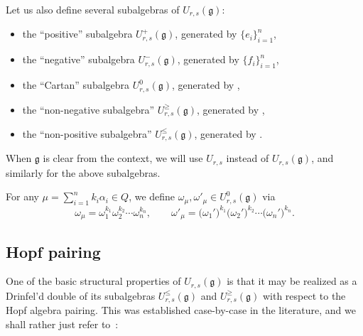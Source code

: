 \documentclass[pdftex]{sigma}
\numberwithin{equation}{section}
\newcommand{\fg}{\mathfrak{g}}
\begin{document}
Let us also define several subalgebras of $U_{r,s}(\fg)$:
\begin{itemize}\itemsep=0pt
\item the ``positive'' subalgebra $U_{r,s}^{+}(\fg)$, generated by $\{e_{i}\}_{i=1}^{n}$,

\item the ``negative'' subalgebra $U_{r,s}^{-}(\fg)$, generated by $\{f_{i}\}_{i=1}^{n}$,

\item the ``Cartan'' subalgebra $U_{r,s}^{0}(\fg)$, generated by
,

\item the ``non-negative subalgebra'' $U_{r,s}^{\ge}(\fg)$, generated by
,

\item the ``non-positive subalgebra'' $U_{r,s}^{\le}(\fg)$, generated by
.

\end{itemize}
When $\fg$ is clear from the context, we will use $U_{r,s}$ instead of $U_{r,s}(\fg)$, and similarly for the above subalgebras.


For any $\mu=\sum_{i=1}^{n} k_{i}\alpha_{i}\in Q$, we define $\omega_\mu,\omega'_\mu\in U_{r,s}^{0}(\fg)$ via
\[
 \omega_{\mu} = \omega_{1}^{k_{1}}\omega_{2}^{k_{2}} \cdots \omega_{n}^{k_{n}}, \qquad
 \omega'_\mu = \bigl(\omega_{1}'\bigr)^{k_{1}}\bigl(\omega_{2}'\bigr)^{k_{2}} \cdots \bigl(\omega_{n}'\bigr)^{k_{n}}.
\]

\subsection{Hopf pairing}%

One of the basic structural properties of $U_{r,s}(\fg)$ is that it may be realized as a Drinfel'd double of its subalgebras $U^{\le}_{r,s}(\fg)$ and $U^{\ge}_{r,s}(\fg)$ with respect to the Hopf algebra pairing. This was established case-by-case in the literature, and we shall rather just refer to~\cite{HP}:
\end{document}
